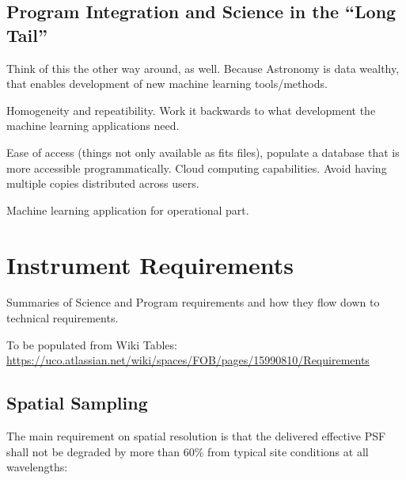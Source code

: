 \documentclass[11pt,a4paper,twoside,onecolumn,openany,final,oldfontcommands]{memoir}
\begin{document}
\section{Program Integration and Science in the ``Long Tail''}


Think of this the other way around, as well.  Because Astronomy is data wealthy, that enables development of new machine learning tools/methods.

Homogeneity and repeatibility.  Work it backwards to what development the machine learning applications need.

Ease of access (things not only available as fits files), populate a database that is more accessible programmatically.  Cloud computing capabilities.  Avoid having multiple copies distributed across users.

Machine learning application for operational part.

\newpage



\chapter{Instrument Requirements}
\label{chap:instr}


Summaries of Science and Program requirements and how they flow down to technical requirements.

To be populated from Wiki Tables: \url{https://uco.atlassian.net/wiki/spaces/FOB/pages/15990810/Requirements}

\section{Spatial Sampling}
\label{sec:sampling}

\medskip
\noindent The main requirement on spatial resolution is that the delivered effective PSF shall not be degraded by more than 60\% from typical site conditions at all wavelengths:
\end{document}
